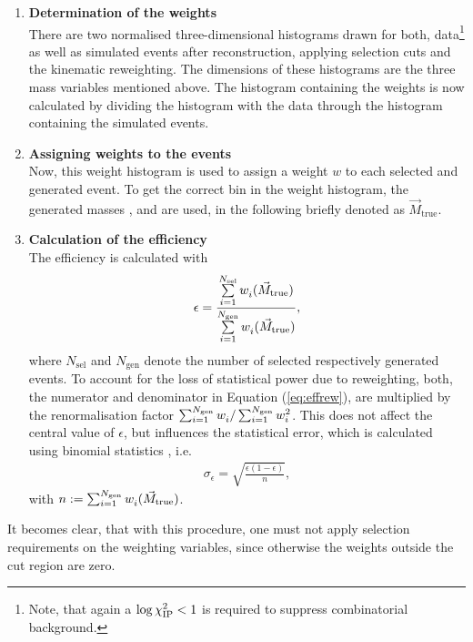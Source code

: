 \begin{enumerate}
    \item \textbf{Determination of the weights} \\
          There are two normalised three-dimensional histograms drawn for both, data\footnote{Note, that again a $\log \chi^2_{\text{IP}} < 1$ is required to suppress combinatorial background.} as well as simulated events after reconstruction, applying selection cuts and the kinematic reweighting. 
          The dimensions of these histograms are the three mass variables mentioned above.
          The histogram containing the weights is now calculated by dividing the histogram with the data through the histogram containing the simulated events.
    \item \textbf{Assigning weights to the events} \\
          Now, this weight histogram is used to assign a weight $w$ to each selected and generated event.
          To get the correct bin in the weight histogram, the generated masses \Mtrue{\Dz\proton}, \Mtrue{\Dz\mun} and \Mtrue{\Dz\proton\mun} are used, in the following briefly denoted as $\vec{M}_\text{true}$.
    \item \textbf{Calculation of the efficiency} \\
          The efficiency is calculated with
          \begin{align}
              \epsilon = \frac{\sum\limits_{i=1}^{N_\text{sel}} w^{\text{}}_{i}(\vec{M}_\text{true})}{\sum\limits_{i=1}^{N_\text{gen}} w^{\text{}}_{i}(\vec{M}_\text{true})}, \label{eq:effrew}
          \end{align}
          where $N_\text{sel}$ and $N_\text{gen}$ denote the number of selected respectively generated events.
          To account for the loss of statistical power due to reweighting, both, the numerator and denominator in Equation (\ref{eq:effrew}), are multiplied by the renormalisation factor $\sum_{i=1}^{N_\text{gen}} w^{\text{}}_{i} / \sum_{i=1}^{N_\text{gen}} w^{\text{2}}_{i}$. 
          This does not affect the central value of $\epsilon$, but influences the statistical error, which is calculated using binomial statistics \cite{Efficiency}, i.e.
          \begin{align}
              \sigma_\epsilon = \sqrt{\frac{\epsilon(1-\epsilon)}{n}}, 
          \end{align}
          with $n := \sum_{i=1}^{N_\text{gen}} w^{\text{}}_{i}(\vec{M}_\text{true})$.
\end{enumerate}
It becomes clear, that with this procedure, one must not apply selection requirements on the weighting variables, since otherwise the weights outside the cut region are zero. 
